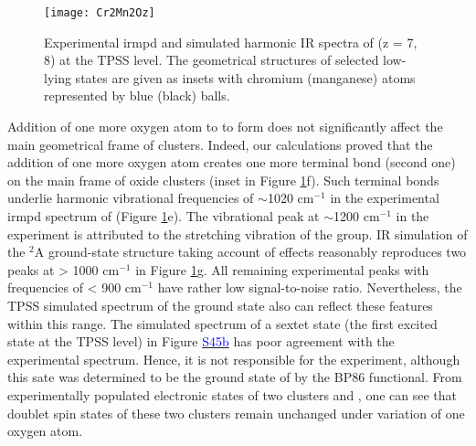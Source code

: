 \begin{refsection}


\begin{figure}[!htb]
	\centering
	\texttt{[image: Cr2Mn2Oz]}
	\caption{Experimental \acrshort{irmpd} and simulated harmonic IR spectra of  (z = 7, 8) at the TPSS level. The geometrical structures of selected low-lying states are given as insets with chromium (manganese) atoms represented by blue (black) balls.}
	\label{fig:Cr2Mn2Oz}
\end{figure}






Addition of one more oxygen atom to  to form  does not significantly affect the main geometrical frame of clusters. Indeed, our calculations proved that the addition of one more oxygen atom creates one more terminal  bond (second one) on the main frame of oxide clusters (inset in Figure \ref{fig:Cr2Mn2Oz}f). Such terminal  bonds underlie harmonic vibrational frequencies of $\sim$1020 cm$^{-1}$ in the experimental \acrshort{irmpd} spectrum of  (Figure \ref{fig:Cr2Mn2Oz}e). The vibrational peak at $\sim$1200 cm$^{-1}$ in the experiment is attributed to the stretching vibration of the  group. IR simulation of the $^2$A ground-state structure taking account of  effects reasonably reproduces two peaks at > 1000 cm$^{-1}$ in Figure \ref{fig:Cr2Mn2Oz}g. All remaining experimental peaks with frequencies of < 900 cm$^{-1}$ have rather low signal-to-noise ratio. Nevertheless, the TPSS simulated spectrum of the ground state also can reflect these features within this range. The simulated spectrum of a sextet state (the first excited state at the TPSS level) in Figure \href{https://github.com/phamlenhan/PhDDissertation/blob/master/Chapter-8SI-Nhan-thesis-CrMnO.pdf}{\textcolor{blue}{S45b}} has poor agreement with the experimental spectrum. Hence, it is not responsible for the experiment, although this sate was determined to be the ground state of  by the BP86 functional. From experimentally populated electronic states of two clusters  and , one can see that doublet spin states of these two clusters remain unchanged under variation of one oxygen atom.  




\end{refsection}
